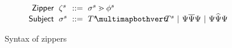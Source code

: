 \begin{figure}
  \vspace{-3px}
  \[
  \arraycolsep=3pt\begin{array}{rlrl}
      \mathsf{Zipper} & \zip^s & ::= & \zipper{\subject^s}{\tfrelem^s} \\
      \mathsf{Subject} & \subject^{s} & ::= &
        \pointing{\tiles^s}{\tiles^s} ~\vert~
        \selecting{\selection}{\selection}{\selection} ~\vert~
        \restructuring{\selection}{\selection}{\selection}
  \end{array}\]
  \caption{
    Syntax of zippers
  }
  \label{fig:zipper-syntax}
\end{figure}
